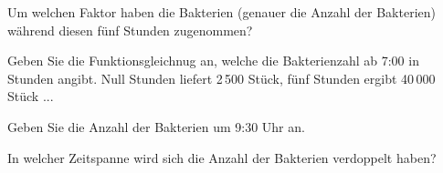 \begin{bbwAufgabenBlock}

\item Um welchen Faktor haben die Bakterien (genauer die Anzahl der Bakterien) während diesen fünf
Stunden zugenommen?


\item Geben Sie die Funktionsgleichnug an, welche die Bakterienzahl ab
7:00 in Stunden angibt. Null Stunden liefert 2\,500 Stück, fünf
      Stunden ergibt 40\,000 Stück ...

\item Geben Sie die Anzahl der Bakterien um 9:30 Uhr an.

\item In welcher Zeitspanne wird sich die Anzahl der Bakterien
verdoppelt haben?

\end{bbwAufgabenBlock}
\platzFuerBerechnungenBisEndeSeite{}


\newpage
